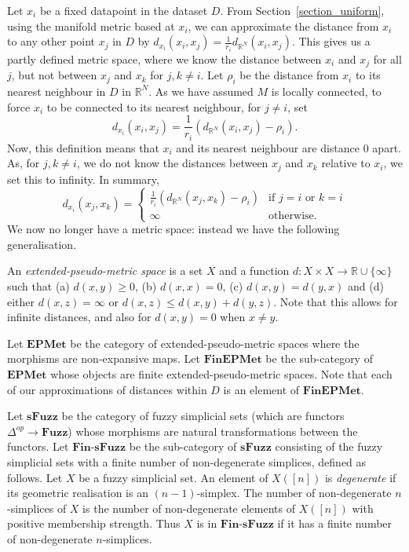 \documentclass[a4paper,11pt,leqno]{article} \usepackage{amsmath}
\newcommand{\RR}{\mathbb{R}} \newcommand{\QQ}{\mathbb{Q}}
\theoremstyle{definition} \newtheorem{defn}{Definition}
\begin{document}
Let $x_i$ be a fixed datapoint in the dataset $D$.  From
Section~\ref{section_uniform}, using the manifold metric based at $x_i$, we can
approximate the distance from $x_i$ to any other point $x_j$ in $D$ by
$d_{x_i}(x_i, x_j) = \frac{1}{r_i}d_{\RR^N}(x_i, x_j)$.  This gives us a partly
defined metric space, where we know the distance between $x_i$ and $x_j$ for all
$j$, but not between $x_j$ and $x_k$ for $j, k\not= i$.  Let $\rho_i$ be the
distance from $x_i$ to its nearest neighbour in $D$ in $\RR^N$.  As we have
assumed $M$ is locally connected, to force $x_i$ to be connected to its nearest
neighbour, for $j\not= i$, set $$d_{x_i}(x_i, x_j)
= \frac{1}{r_i}(d_{\RR^N}(x_i, x_j)-\rho_i).$$ Now, this definition means that
$x_i$ and its nearest neighbour are distance 0 apart.  As, for $j, k\not= i$, we
do not know the distances between $x_j$ and $x_k$ relative to $x_i$, we set this
to infinity.  In summary, $$d_{x_i}(x_j, x_k) = \begin{cases}
\frac{1}{r_i}(d_{\RR^N}(x_j, x_k)-\rho_i) & \text{if $j = i$ or $k = i$}\\
\infty	& \text{otherwise.} \end{cases}$$ We now no longer have a metric space:
instead we have the following generalisation.

An \emph{extended-pseudo-metric space} is a set $X$ and a function $d: X\times
X\to \RR\cup\{\infty\}$ such that (a) $d(x, y) \geq 0$, (b) $d(x, x) = 0$, (c)
$d(x, y) = d(y, x)$ and (d) either $d(x, z) = \infty$ or $d(x, z) \leq d(x, y)
+ d(y, z)$.  Note that this allows for infinite distances, and also for $d(x, y)
= 0$ when $x\not= y$.

Let $\textbf{EPMet}$ be the category of extended-pseudo-metric spaces where the
morphisms are non-expansive maps.  Let $\textbf{FinEPMet}$ be the sub-category
of $\textbf{EPMet}$ whose objects are finite extended-pseudo-metric spaces.
Note that each of our approximations of distances within $D$ is an element of
$\textbf{FinEPMet}$.

Let $\textbf{sFuzz}$ be the category of fuzzy simplicial sets (which are
functors $\Delta^{op}\to \textbf{Fuzz}$) whose morphisms are natural
transformations between the functors.  Let $\textbf{Fin-sFuzz}$ be the
sub-category of $\textbf{sFuzz}$ consisting of the fuzzy simplicial sets with
a finite number of non-degenerate simplices, defined as follows.  Let $X$ be
a fuzzy simplicial set.  An element of $X([n])$ is \emph{degenerate} if its
geometric realisation is an $(n-1)$-simplex.  The number of non-degenerate
$n$-simplices of $X$ is the number of non-degenerate elements of $X([n])$ with
positive membership strength.  Thus $X$ is in $\textbf{Fin-sFuzz}$ if it has
a finite number of non-degenerate $n$-simplices.
\end{document}
